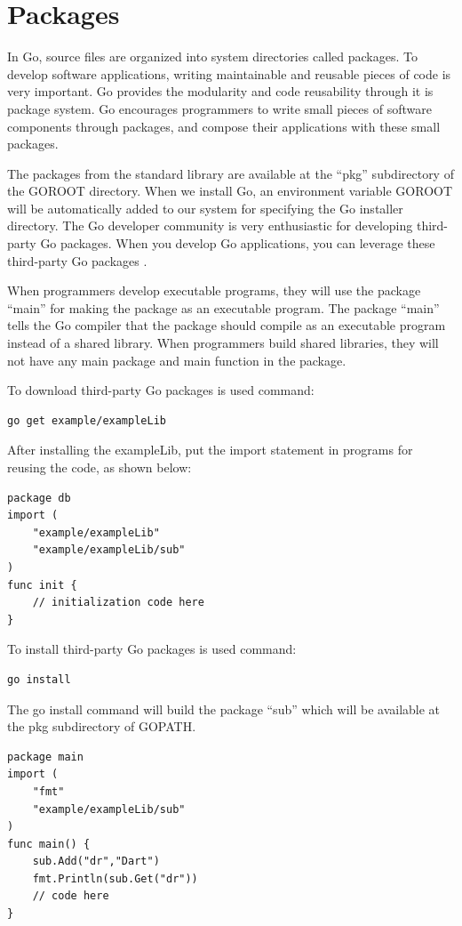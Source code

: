 \documentclass[
  digital, %
  notable,   %
  lof,     %
  lot,     %
]{fithesis3}
\begin{document}
\section{Packages}
In Go, source files are organized into system directories called packages. To  develop 
software applications, writing maintainable and reusable pieces of code is very important. Go 
provides the modularity and code reusability through it is package system. Go encourages 
programmers to write small pieces of software components through packages, and compose their  
applications with these small packages.

The packages from the standard library are available at the “pkg” subdirectory of the GOROOT 
directory. When we install Go, an environment variable GOROOT will be automatically added to 
our system for specifying the Go installer directory. The Go developer community is very 
enthusiastic for developing third-party Go packages. When you develop Go applications, you can 
leverage these third-party Go packages \cite{stack_2014}.

When programmers develop executable programs, they will use the package “main” for making the 
package as an executable program. The package “main” tells the Go compiler that the package 
should compile as an executable program instead of a shared library. When programmers build 
shared libraries, they will not have any main package and main function in the package.

To download third-party Go packages is used command: 
\begin{lstlisting}
go get example/exampleLib
\end{lstlisting}
After installing the exampleLib, put the import statement in programs for reusing the code, as 
shown below:
\begin{lstlisting}
package db
import (
	"example/exampleLib"
	"example/exampleLib/sub"
)
func init {
	// initialization code here    
}
\end{lstlisting}
To install third-party Go packages is used command: 
\begin{lstlisting}
go install
\end{lstlisting}
The go install command will build the package “sub” which will be available at the pkg 
subdirectory of GOPATH.
\begin{lstlisting}
package main
import (
	"fmt"
	"example/exampleLib/sub"
)
func main() {
    sub.Add("dr","Dart")
    fmt.Println(sub.Get("dr"))
    // code here    
}
\end{lstlisting}
\end{document}
